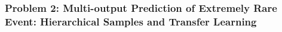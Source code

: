 \subsubsection{Problem 2: Multi-output Prediction of Extremely Rare Event: Hierarchical Samples and Transfer Learning}
